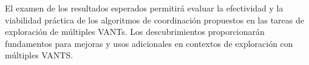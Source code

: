 \documentclass[sigconf]{acmart}
\begin{document}
El examen de los resultados esperados permitirá evaluar la efectividad y la viabilidad práctica de los algoritmos de coordinación propuestos en las tareas de exploración de múltiples VANTs. Los descubrimientos proporcionarán fundamentos para mejoras y usos adicionales en contextos de exploración con múltiples VANTS.

    









\end{document}
